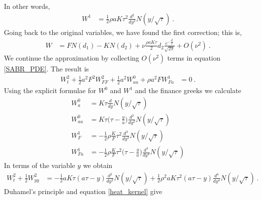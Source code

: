 \documentclass[10pt]{article}
\numberwithin{equation}{section}
\begin{document}
In other words,
\begin{equation*}
	\begin{split}
	W^{1}&=\frac{1}{2}\rho a K \tau^2 \frac{d^2}{dy^2}N(y/\sqrt{\tau})\:.
	\end{split}
\end{equation*}
Going back to the original variables, we have found the first correction; this is,
\begin{equation*}
	\begin{split}
	W&=FN(d_1)-KN(d_2)+\nu \frac{\rho a K \tau }{2} d_2 \frac{e^{-\frac{d_2^2}{2}} }{\sqrt{2\pi}} +O(\nu^2)\:.
	\end{split}
\end{equation*}
We continue the approximation by collecting $O(\nu^2)$ terms in equation \eqref{SABR_PDE}. The result is
\begin{equation*}
	\begin{split}
	W^{2}_{t} +\frac{1}{2} a^2 F^2 W^{2}_{FF}+\frac{1}{2} a^2 W^{0}_{aa}+\rho a^2 F W^{1}_{Fa}&=0\:.
	\end{split}
\end{equation*}
Using the explicit formulae for $W^{0}$ and $W^{1}$ and the finance greeks we calculate
\begin{equation*}
	\begin{split}
	  W_{a}^{0} &= K\tau \frac{d}{dy} N(y/\sqrt{\tau})\\
	  W_{aa}^{0} &= K\tau\biggl( \tau - \frac{y}{a}\biggr) \frac{d^2}{d y^2} N(y/\sqrt{\tau})\\
	  W_{F}^{1} &= -\frac{1}{2}\rho \frac{K}{F} \tau^2 \frac{d^3}{dy^3}N(y/\sqrt{\tau})\\
	    W_{Fa}^{1} &= -\frac{1}{2}\rho \frac{K}{F} \tau^2 \biggl(\tau-\frac{y}{a}\biggr) \frac{d^4}{dy^4}N(y/\sqrt{\tau})
	\end{split}
\end{equation*}
In terms of the variable $y$ we obtain
\begin{equation*}
	\begin{split}
	W^{2}_{t} +\frac{1}{2} W^{2}_{yy} &= -\frac{1}{2}aK\tau ( a\tau - y ) \frac{d^2}{d y^2} N(y/\sqrt{\tau}) +\frac{1}{2}\rho^2 a K \tau^2 (a\tau-y ) \frac{d^4}{dy^4}N(y/\sqrt{\tau})\:.
	\end{split}
\end{equation*}
Duhamel's principle and equation \eqref{heat_kernel} give
\end{document}
